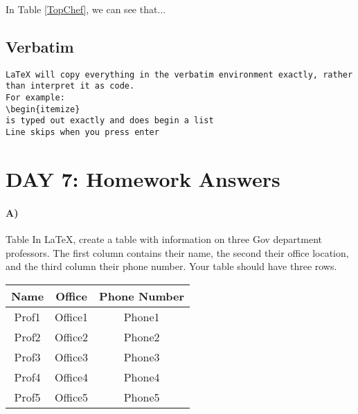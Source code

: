 \documentclass[10pt]{article}
\begin{document}
In Table \ref{TopChef}, we can see that...


\subsection*{Verbatim}

\begin{verbatim}
LaTeX will copy everything in the verbatim environment exactly, rather than interpret it as code.
For example:
\begin{itemize}
is typed out exactly and does begin a list
Line skips when you press enter
\end{verbatim}

\section*{DAY 7: Homework Answers}
\paragraph{A)} Table
In \LaTeX, create a table with information on three Gov department professors. The first column contains their name, the second their office location, and the third column their phone number. Your table should have three rows.

\begin{table}[!htp]
\begin{center}
\begin{tabular}{c|c|c}
Name & Office & Phone Number\\
\hline
Prof1 & Office1 & Phone1\\
\hline
Prof2 & Office2 & Phone2\\
\hline
Prof3 & Office3 & Phone3\\
\hline
Prof4 & Office4 & Phone4\\
\hline
Prof5 & Office5 & Phone5\\
\hline
\end{tabular}
\end{center}
\end{table}
\end{document}
